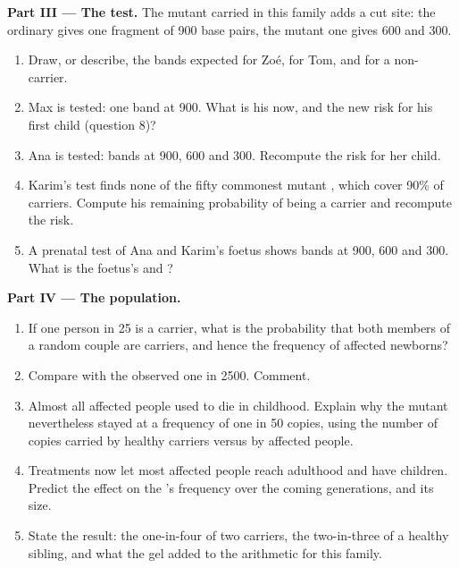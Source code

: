 \begin{problem}
\medskip
\noindent\textbf{Part III --- The test.}
The mutant  carried in this family adds a cut site: the ordinary
 gives one fragment of 900 base pairs, the mutant one gives 600
and 300.
\begin{enumerate}[resume]
  \item Draw, or describe, the bands expected for Zoé, for Tom, and
        for a non-carrier.
  \item Max is tested: one band at 900. What is his  now, and
        the new risk for his first child (question 8)?
  \item Ana is tested: bands at 900, 600 and 300. Recompute the risk
        for her child.
  \item Karim's test finds none of the fifty commonest mutant ,
        which cover 90\% of carriers. Compute his remaining
        probability of being a carrier and recompute the risk.
  \item A prenatal test of Ana and Karim's foetus shows bands at 900,
        600 and 300. What is the foetus's  and ?
\end{enumerate}

\medskip
\noindent\textbf{Part IV --- The population.}
\begin{enumerate}[resume]
  \item If one person in 25 is a carrier, what is the probability
        that both members of a random couple are carriers, and hence
        the frequency of affected newborns?
  \item Compare with the observed one in 2500. Comment.
  \item Almost all affected people used to die in childhood. Explain
        why the mutant  nevertheless stayed at a frequency of
        one in 50 copies, using the number of copies carried by
        healthy carriers versus by affected people.
  \item Treatments now let most affected people reach adulthood and
        have children. Predict the effect on the 's frequency
        over the coming generations, and its size.
  \item State the result: the one-in-four of two carriers, the
        two-in-three of a healthy sibling, and what the gel added to
        the arithmetic for this family.
\end{enumerate}
\end{problem}
